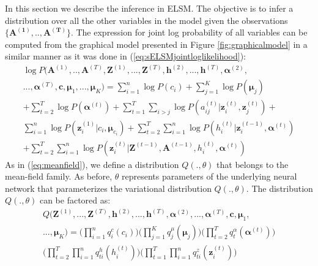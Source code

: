 \documentclass[letterpaper]{article} %
\begin{document}
In this section we describe the inference in ELSM. The objective is to infer a distribution over all the other variables in the model given the observations $\{\mathbf{A^{(1)}}, .., \mathbf{A^{(T)}}\}$. The expression for joint log probability of all variables can be computed from the graphical model presented in Figure \ref{fig:graphicalmodel} in a similar manner as it was done in (\ref{eq:sELSMjointloglikelihood}):
\begin{equation}
    \label{eq:ELSMjointlikelihood}
    \begin{split}
    \log P(\mathbf{A}^{(1)}, .., \mathbf{A}^{(T)}, \mathbf{Z}^{(1)}, ..., \mathbf{Z}^{(T)}, {\mathbf{h}^{(2)}}, ..., {\mathbf{h}^{(T)}}, \bm{\alpha}^{(2)}, \\..., \bm{\alpha}^{(T)}, \mathbf{c}, \bm{\mu}_1, ..., \bm{\mu}_K) = 
    \sum_{i=1}^{n} \log P({c_i}) + 
    \sum_{j=1}^{K} \log P(\bm{\mu}_j) \\ +
    \sum_{t=2}^{T} \log P(\bm{\alpha}^{(t)}) + 
    \sum_{t=1}^{T} \sum_{i > j} \log P({a_{ij}^{(t)}} | \mathbf{z}_i^{(t)}, \mathbf{z}_j^{(t)}) + \\
    \sum_{i=1}^{n} \log P(\mathbf{z}_{i}^{(1)} | {c_i}, \bm{\mu}_{c_i}) +
    \sum_{t=2}^{{T}} \sum_{i=1}^{n} \log P({h_{i}^{(t)}} | \mathbf{z}_i^{(t-1)}, \bm{\alpha}^{(t)}) \\+
    \sum_{t=2}^{{T}} \sum_{i=1}^{n} \log P(\mathbf{z}_{i}^{(t)} | \mathbf{Z}^{(t-1)}, \mathbf{A}^{(t-1)}, {h_i^{(t)}}, \bm{\alpha}^{(t)})
    \end{split}
\end{equation}
As in (\ref{eq:meanfield}), we define a distribution $Q(., \theta)$ that belongs to the mean-field family. As before, $\theta$ represents parameters of the underlying neural network that parameterizes the variational distribution $Q(., \theta)$. The distribution $Q(., \theta)$ can be factored as:
\begin{equation}
	\label{eq:ELSMmeanfield}
	\begin{split}
	Q(\mathbf{Z}^{(1)}, ..., \mathbf{Z}^{(T)}, {\mathbf{h}^{(2)}}, ..., {\mathbf{h}^{(T)}}, \bm{\alpha}^{(2)}, ..., \bm{\alpha}^{(T)}, \mathbf{c}, \bm{\mu}_1, \\..., \bm{\mu}_K) = 
	\Big(\prod_{i=1}^{n} q^{c}_i({c_i})\Big)
	\Big(\prod_{j=1}^{K} q^{\mu}_j(\bm{\mu}_j)\Big)
	\Big(\prod_{t=2}^{T} q^{\alpha}_t(\bm{\alpha}^{(t)})\Big) \\
	\Big(\prod_{t=2}^{T} \prod_{i=1}^{n} q^{h}_{ti}({h_i^{(t)}})\Big)
	\Big(\prod_{t=1}^{T} \prod_{i=1}^{n} q^{z}_{ti}(\mathbf{z}_i^{(t)})\Big)	
	\end{split}
\end{equation}
\end{document}
